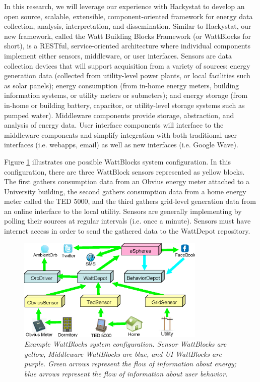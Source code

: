 In this research, we will leverage our experience with Hackystat to
develop an open source, scalable, extensible,
component-oriented framework for energy data collection, analysis,
interpretation, and dissemination.  Similar to Hackystat, our new framework, called the
Watt Building Blocks Framework (or WattBlocks for short), is a RESTful,
service-oriented architecture where individual components implement either
sensors, middleware, or user interfaces.  Sensors are data collection
devices that will support acquisition from a variety of sources: energy
generation data (collected from utility-level power plants, or local
facilities such as solar panels); energy consumption (from in-home energy
meters, building information systems, or utility meters or submeters); and
energy storage (from in-home or building battery, capacitor, or
utility-level storage systems such as pumped water).  Middleware components
provide storage, abstraction, and analysis of energy data. User interface
components will interface to the middleware components and simplify
integration with both traditional user interfaces (i.e. webapps, email) as
well as new interfaces (i.e. Google Wave).

Figure \ref{fig:WattBlocks} illustrates one possible WattBlocks system
configuration.  In this configuration, there are three WattBlock sensors
represented as yellow blocks.  The first gathers consumption data from an
Obvius energy meter attached to a University building, the second gathers
consumption data from a home energy meter called the TED 5000, and the
third gathers grid-level generation data from an online interface to the
local utility.  Sensors are generally implementing by polling their sources
at regular intervals (i.e. once a minute). Sensors must have internet
access in order to send the gathered data to the WattDepot repository.


\begin{figure}[th]
  \center
  \includegraphics[width=0.8\textwidth]{architecture.4.eps}
  \caption{\em \small Example WattBlocks system configuration. Sensor WattBlocks are
    yellow, Middleware WattBlocks are blue, and UI WattBlocks are purple.
    Green arrows represent the flow of information about energy; blue
    arrows represent the flow of information about user behavior.}
  \label{fig:WattBlocks}
\end{figure} 


